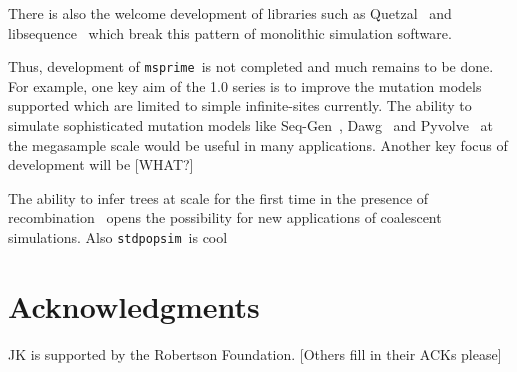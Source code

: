 \documentclass{article}
\newcommand{\msprime}[0]{\texttt{msprime}}
\newcommand{\stdpopsim}[0]{\texttt{stdpopsim}}
\newcommand{\msprime}[0]{{\texttt{msprime} }}
\newcommand{\stdpopsim}[0]{{\texttt{stdpopsim} }}
\begin{document}
There is also the welcome development of libraries such as
Quetzal~\citep{becheler2019quetzal} and libsequence~\citep{thornton2014cpp}
which break this pattern of monolithic simulation software.


Thus, development of \msprime\ is not completed and much remains
to be done. For example, one key aim of the 1.0 series is to
improve the mutation models supported which are limited to
simple infinite-sites currently. The ability to simulate
sophisticated mutation models like Seq-Gen~\citep{rambaut1997seq},
Dawg~\citep{cartwright2005dna} and Pyvolve~\citep{spielman2015pyvolve} at the megasample scale would be
useful in many applications. Another key focus of development
will be [WHAT?]

The ability to infer trees at scale for the first time
in the presence of
recombination~\citep{harris2019database,kelleher2019inferring,
speidel2019method,tang2019genealogy}
opens the possibility for new applications of coalescent simulations.
Also \stdpopsim\ is cool~\citep{adrion2019community}

\section*{Acknowledgments}
JK is supported by the Robertson Foundation. [Others fill in their ACKs please]



\end{document}
